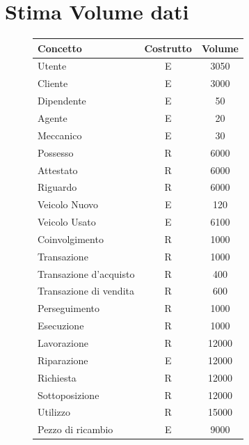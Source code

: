 \documentclass[a4paper,12pt]{report}
\begin{document}
\section{Stima Volume dati}
\begin{figure}[H]
	\fontsize{14pt}{12pt}\selectfont
	\advance\leftskip-15cm
	\centering
	\begin{tabular}{l c c }
		\rowcolor{BlueGreen}
		\rule[-3mm]{0mm}{0.85cm}
		\textbf{Concetto} & \textbf{Costrutto} &\textbf{Volume} \\
		\hline\rule[-2mm]{0mm}{0.75cm}
		Utente & E & 3050\\
		\hline\rule[-2mm]{0mm}{0.75cm}
		Cliente & E & 3000 \\
		\hline\rule[-2mm]{0mm}{0.75cm}
		Dipendente & E & 50\\
		\hline\rule[-2mm]{0mm}{0.75cm}
		Agente & E & 20\\
		\hline\rule[-2mm]{0mm}{0.75cm}
		Meccanico & E & 30\\
		\hline\rule[-2mm]{0mm}{0.75cm}
		Possesso & R & 6000 \\
		\hline\rule[-2mm]{0mm}{0.75cm}
		Attestato & R & 6000\\
		\hline\rule[-2mm]{0mm}{0.75cm}
		Riguardo & R & 6000 \\
		\hline\rule[-2mm]{0mm}{0.75cm}
		Veicolo Nuovo & E & 120 \\
		\hline\rule[-2mm]{0mm}{0.75cm}
		Veicolo Usato & E & 6100 \\
		\hline\rule[-2mm]{0mm}{0.75cm}
		Coinvolgimento & R & 1000\\
		\hline\rule[-2mm]{0mm}{0.75cm}
		Transazione & R & 1000\\
		\hline\rule[-2mm]{0mm}{0.75cm}
		Transazione d'acquisto& R & 400\\
		\hline\rule[-2mm]{0mm}{0.75cm}
		Transazione di vendita& R & 600\\
		\hline\rule[-2mm]{0mm}{0.75cm}
		Perseguimento & R & 1000\\
		\hline\rule[-2mm]{0mm}{0.75cm}
		Esecuzione & R & 1000\\
		\hline\rule[-2mm]{0mm}{0.75cm}
		Lavorazione & R & 12000\\
		\hline\rule[-2mm]{0mm}{0.75cm}
		Riparazione & E & 12000\\
		\hline\rule[-2mm]{0mm}{0.75cm}
		Richiesta & R & 12000\\
		\hline\rule[-2mm]{0mm}{0.75cm}
		Sottoposizione & R & 12000\\
		\hline\rule[-2mm]{0mm}{0.75cm}
		Utilizzo & R & 15000\\
		\hline\rule[-2mm]{0mm}{0.75cm}
		Pezzo di ricambio & E &  9000\\
		\hline
	\end{tabular}
\end{figure}
\end{document}
